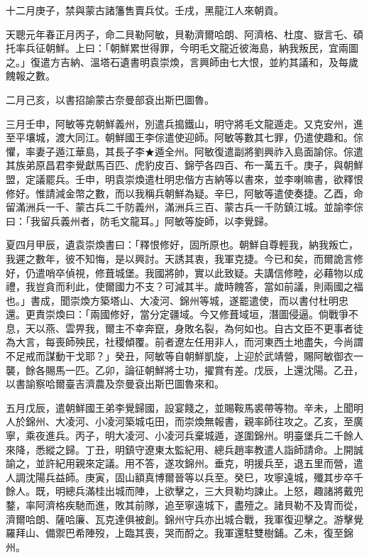 \begin{pinyinscope}
十二月庚子，禁與蒙古諸籓售賣兵仗。壬戌，黑龍江人來朝貢。

天聰元年春正月丙子，命二貝勒阿敏，貝勒濟爾哈朗、阿濟格、杜度、嶽言乇、碩托率兵征朝鮮。上曰：「朝鮮累世得罪，今明毛文龍近彼海島，納我叛民，宜兩圖之。」復遣方吉納、溫塔石遺書明袁崇煥，言興師由七大恨，並約其議和，及每歲餽報之數。

二月己亥，以書招諭蒙古奈曼部袞出斯巴圖魯。

三月壬申，阿敏等克朝鮮義州，別遣兵搗鐵山，明守將毛文龍遁走。又克安州，進至平壤城，渡大同江。朝鮮國王李倧遣使迎師。阿敏等數其七罪，仍遣使趣和。倧懼，率妻子遁江華島，其長子李★遁全州。阿敏復遣副將劉興祚入島面諭倧。倧遣其族弟原昌君李覺獻馬百匹、虎豹皮百、錦苧各四百、布一萬五千。庚子，與朝鮮盟，定議罷兵。壬申，明袁崇煥遣杜明忠偕方吉納等以書來，並李喇嘛書，欲釋恨修好。惟請減金幣之數，而以我稱兵朝鮮為疑。辛巳，阿敏等遣使奏捷。乙酉，命留滿洲兵一千、蒙古兵二千防義州，滿洲兵三百、蒙古兵一千防鎮江城。並諭李倧曰：「我留兵義州者，防毛文龍耳。」阿敏等旋師，以李覺歸。

夏四月甲辰，遺袁崇煥書曰：「釋恨修好，固所原也。朝鮮自尊輕我，納我叛亡，我遲之數年，彼不知悔，是以興討。天誘其衷，我軍克捷。今已和矣，而爾詭言修好，仍遣哨卒偵視，修葺城堡。我國將帥，實以此致疑。夫講信修睦，必藉物以成禮，我豈貪而利此，使爾國力不支？可減其半。歲時餽答，當如前議，則兩國之福也。」書成，聞崇煥方築塔山、大凌河、錦州等城，遂罷遣使，而以書付杜明忠還。更責崇煥曰：「兩國修好，當分定疆域。今又修葺域垣，潛圖侵逼。倘戰爭不息，天以燕、雲畀我，爾主不幸奔竄，身敗名裂，為何如也。自古文臣不更事者徒為大言，每喪師殃民，社稷傾覆。前者遼左任用非人，而河東西土地盡失，今尚謂不足戒而謀動干戈耶？」癸丑，阿敏等自朝鮮凱旋，上迎於武靖營，賜阿敏御衣一襲，餘各賜馬一匹。乙卯，論征朝鮮將士功，擢賞有差。戊辰，上還沈陽。乙丑，以書諭察哈爾臺吉濟農及奈曼袞出斯巴圖魯來和。

五月戊辰，遣朝鮮國王弟李覺歸國，設宴餞之，並賜鞍馬裘帶等物。辛未，上聞明人於錦州、大凌河、小凌河築城屯田，而崇煥無報書，親率師往攻之。乙亥，至廣寧，乘夜進兵。丙子，明大凌河、小凌河兵棄城遁，遂圍錦州。明臺堡兵二千餘人來降，悉縱之歸。丁丑，明鎮守遼東太監紀用、總兵趙率教遣人詣師請命。上開誠諭之，並許紀用親來定議。用不答，遂攻錦州。垂克，明援兵至，退五里而營，遣人調沈陽兵益師。庚寅，固山額真博爾晉等以兵至。癸巳，攻寧遠城，殲其步卒千餘人。既，明總兵滿桂出城而陣，上欲擊之，三大貝勒均諫止。上怒，趣諸將戴兜鍪，率阿濟格疾馳而進，敗其前隊，追至寧遠城下，盡殪之。諸貝勒不及胄而從，濟爾哈朗、薩哈廉、瓦克達俱被創。錦州守兵亦出城合戰，我軍復迎擊之。游擊覺羅拜山、備禦巴希陣歿，上臨其喪，哭而酹之。我軍還駐雙樹鋪。乙未，復至錦州。


\end{pinyinscope}
